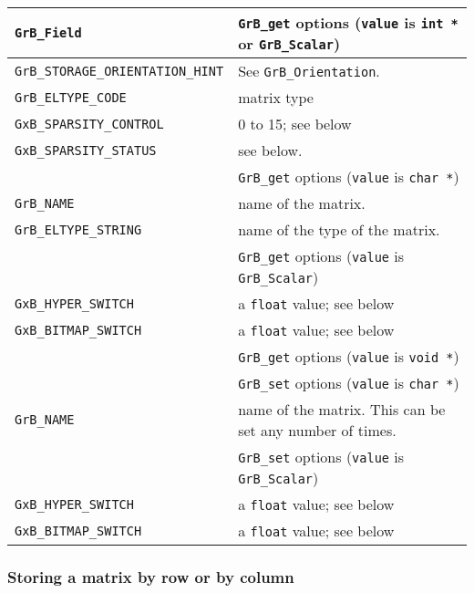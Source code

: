 \noindent
{\small
\begin{tabular}{p{2.25in}p{3.5in}}
\hline
\hline
\verb'GrB_Field'                    & \verb'GrB_get' options (\verb'value' is \verb'int *' or \verb'GrB_Scalar') \\
\hline
\verb'GrB_STORAGE_ORIENTATION_HINT' & See \verb'GrB_Orientation'. \\
\verb'GrB_ELTYPE_CODE'              & matrix type \\
\verb'GxB_SPARSITY_CONTROL'         & 0 to 15; see below \\
\verb'GxB_SPARSITY_STATUS'          & see below. \\
\hline
\hline
                                    & \verb'GrB_get' options (\verb'value' is \verb'char *') \\
\hline
\verb'GrB_NAME'                     & name of the matrix. \\
\verb'GrB_ELTYPE_STRING'            & name of the type of the matrix. \\
\hline
\hline
                                    & \verb'GrB_get' options (\verb'value' is \verb'GrB_Scalar') \\
\hline
\hline
\verb'GxB_HYPER_SWITCH'             & a \verb'float' value; see below \\
\verb'GxB_BITMAP_SWITCH'            & a \verb'float' value; see below \\
\hline
                                    & \verb'GrB_get' options (\verb'value' is \verb'void *') \\
\hline
\hline
                                    & \verb'GrB_set' options (\verb'value' is \verb'char *') \\
\hline
\verb'GrB_NAME'                     & name of the matrix.
                                        This can be set any number of times. \\
\hline
\hline
                                    & \verb'GrB_set' options (\verb'value' is \verb'GrB_Scalar') \\
\hline
\verb'GxB_HYPER_SWITCH'             & a \verb'float' value; see below \\
\verb'GxB_BITMAP_SWITCH'            & a \verb'float' value; see below \\
\hline
\end{tabular}
}

\subsubsection{Storing a matrix by row or by column}

